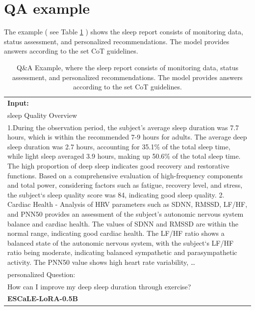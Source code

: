 \documentclass[preprint,12pt]{elsarticle}
\begin{document}
\section{QA example}
\label{appendix: QA examplesss}
The example ( see Table \ref{tab:QA_example} ) shows the sleep report consists of monitoring data, status assessment, and personalized recommendations. The model provides answers according to the set CoT guidelines.
\begin{table}[!t]
\centering
\caption{\label{tab:QA_example}Q\&A Example, where the sleep report consists of monitoring data, status assessment, and personalized recommendations. The model provides answers according to the set CoT guidelines.}
\fontsize{9.5pt}{12pt}\selectfont
\begin{tabular}{@{}p{}@{}}
\toprule
\textbf{Input:} \\
sleep Quality Overview\\
1.During the observation period, the subject’s average sleep duration was 7.7 hours, which is within the recommended 7-9 hours for adults. The average deep sleep duration was 2.7 hours, accounting for 35.1\% of the total sleep time, while light sleep averaged 3.9 hours, making up 50.6\% of the total sleep time. The high proportion of deep sleep indicates good recovery and restorative functions. Based on a comprehensive evaluation of high-frequency components and total power, considering factors such as fatigue, recovery level, and stress, the subject‘s sleep quality score was 84, indicating good sleep quality. 2. Cardiac Health - Analysis of HRV parameters such as SDNN, RMSSD, LF/HF, and PNN50 provides an assessment of the subject’s autonomic nervous system balance and cardiac health. The values of SDNN and RMSSD are within the normal range, indicating good cardiac health. The LF/HF ratio shows a balanced state of the autonomic nervous system, with the subject‘s LF/HF ratio being moderate, indicating balanced sympathetic and parasympathetic activity. The PNN50 value shows high heart rate variability, … \\
personalized Question: \\
How can I improve my deep sleep duration through exercise? \\
\textbf{ESCaLE-LoRA-0.5B} \\

\end{tabular}
\end{table}
\end{document}
